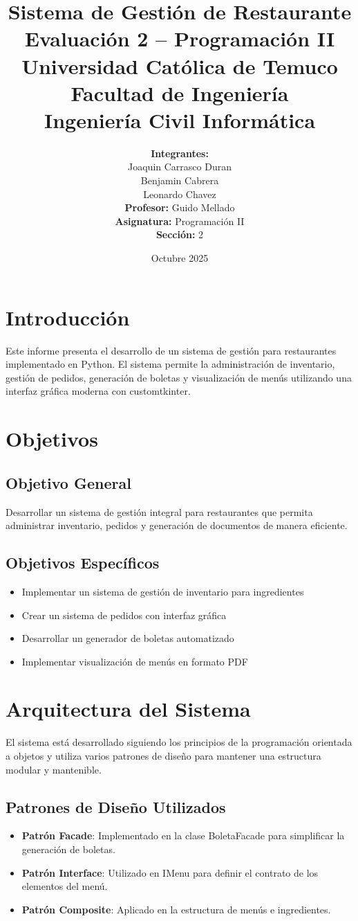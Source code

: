 \documentclass[12pt,letterpaper]{article}
\title{\textbf{Sistema de Gestión de Restaurante}\\
\large Evaluación 2 -- Programación II\\
\vspace{0.5cm}
\normalsize Universidad Católica de Temuco\\
\normalsize Facultad de Ingeniería\\
\normalsize Ingeniería Civil Informática}
\author{
    \textbf{Integrantes:}\\
    \vspace{0.3cm}
    Joaquin Carrasco Duran\\
    \vspace{0.3cm}
    Benjamin Cabrera\\
    \vspace{0.3cm}
    Leonardo Chavez\\
    \vspace{0.3cm}
    \textbf{Profesor:} Guido Mellado\\
    \vspace{0.3cm}
    \textbf{Asignatura:} Programación II\\
    \vspace{0.3cm}
    \textbf{Sección:} 2
}
\date{Octubre 2025}
\begin{document}
\maketitle
\newpage
\tableofcontents
\newpage

\section{Introducción}
Este informe presenta el desarrollo de un sistema de gestión para restaurantes implementado en Python. El sistema permite la administración de inventario, gestión de pedidos, generación de boletas y visualización de menús utilizando una interfaz gráfica moderna con customtkinter.

\section{Objetivos}
\subsection{Objetivo General}
Desarrollar un sistema de gestión integral para restaurantes que permita administrar inventario, pedidos y generación de documentos de manera eficiente.

\subsection{Objetivos Específicos}
\begin{itemize}
    \item Implementar un sistema de gestión de inventario para ingredientes
    \item Crear un sistema de pedidos con interfaz gráfica
    \item Desarrollar un generador de boletas automatizado
    \item Implementar visualización de menús en formato PDF
\end{itemize}

\section{Arquitectura del Sistema}
El sistema está desarrollado siguiendo los principios de la programación orientada a objetos y utiliza varios patrones de diseño para mantener una estructura modular y mantenible.

\subsection{Patrones de Diseño Utilizados}
\begin{itemize}
    \item \textbf{Patrón Facade}: Implementado en la clase BoletaFacade para simplificar la generación de boletas.
    \item \textbf{Patrón Interface}: Utilizado en IMenu para definir el contrato de los elementos del menú.
    \item \textbf{Patrón Composite}: Aplicado en la estructura de menús e ingredientes.
\end{itemize}
\end{document}
